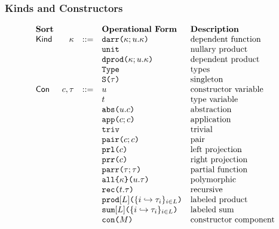 \subsubsection{Kinds and Constructors}
\[\begin{array}{lrlllll}
\textbf{Sort} & & & \textbf{Operational Form} 
& \textbf{Description}\\
\mathsf{Kind} & \kappa & ::= & \texttt{darr}\texttt{(}\kappa; u.\kappa\texttt{)} 
& \text{dependent function}\\
&&& \texttt{unit} 
& \text{nullary product}\\
&&& \texttt{dprod}\texttt{(}\kappa; u.\kappa\texttt{)} 
& \text{dependent product}\\
&&& \texttt{Type} 
& \text{types}\\
&&& \texttt{S}\texttt{(}\tau\texttt{)} 
& \text{singleton}\\
\mathsf{Con} & c, \tau & ::= & u 
& \text{constructor variable}\\
&&& t 
& \text{type variable}
\\
&&& \texttt{abs}\texttt{(}u.c\texttt{)} 
& \text{abstraction}\\
&&& \texttt{app}\texttt{(}c; c\texttt{)} 
& \text{application}\\
&&& \texttt{triv} 
& \text{trivial}\\
&&& \texttt{pair}\texttt{(}c; c\texttt{)}
& \text{pair}\\
&&& \texttt{prl}\texttt{(}c\texttt{)} 
& \text{left projection}\\
&&& \texttt{prr}\texttt{(}c\texttt{)} 
& \text{right projection}\\
&&& \texttt{parr}\texttt{(}\tau; \tau\texttt{)} 
& \text{partial function}\\
&&& \texttt{all}\texttt{\{}\kappa\texttt{\}(}u.\tau\texttt{)} 
& \text{polymorphic}\\
&&& \texttt{rec}\texttt{(}t.\tau\texttt{)} 
& \text{recursive}\\
&&& \texttt{prod}[L]\texttt{(}\{i \hookrightarrow \tau_{i}\}_{i \in L}\texttt{)} 
& \text{labeled product}\\
&&& \texttt{sum}[L]\texttt{(}\{i \hookrightarrow \tau_{i}\}_{i \in L}\texttt{)} 
& \text{labeled sum}\\
&&& \texttt{con}\texttt{(}M\texttt{)} 
& \text{constructor component}
\end{array}\]
\clearpage

